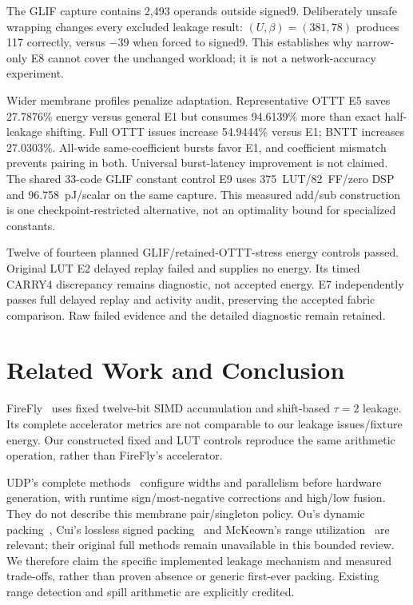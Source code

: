 \documentclass[conference]{IEEEtran}
\begin{document}
The GLIF capture contains 2,493 operands outside signed9. Deliberately unsafe wrapping changes every excluded leakage result: $(U,\beta)=(381,78)$ produces 117 correctly, versus $-39$ when forced to signed9. This establishes why narrow-only E8 cannot cover the unchanged workload; it is not a network-accuracy experiment.

Wider membrane profiles penalize adaptation. Representative OTTT E5 saves 27.7876\% energy versus general E1 but consumes 94.6139\% more than exact half-leakage shifting. Full OTTT issues increase 54.9444\% versus E1; BNTT increases 27.0303\%. All-wide same-coefficient bursts favor E1, and coefficient mismatch prevents pairing in both. Universal burst-latency improvement is not claimed. The shared 33-code GLIF constant control E9 uses 375~LUT/82~FF/zero DSP and 96.758~pJ/scalar on the same capture. This measured add/sub construction is one checkpoint-restricted alternative, not an optimality bound for specialized constants.

Twelve of fourteen planned GLIF/retained-OTTT-stress energy controls passed. Original LUT E2 delayed replay failed and supplies no energy. Its timed CARRY4 discrepancy remains diagnostic, not accepted energy. E7 independently passes full delayed replay and activity audit, preserving the accepted fabric comparison. Raw failed evidence and the detailed diagnostic remain retained.

\section{Related Work and Conclusion}
FireFly~\cite{firefly} uses fixed twelve-bit SIMD accumulation and shift-based $\tau=2$ leakage. Its complete accelerator metrics are not comparable to our leakage issues/fixture energy. Our constructed fixed and LUT controls reproduce the same arithmetic operation, rather than FireFly's accelerator.

UDP's complete methods~\cite{udp} configure widths and parallelism before hardware generation, with runtime sign/most-negative corrections and high/low fusion. They do not describe this membrane pair/singleton policy. Ou's dynamic packing~\cite{ou}, Cui's lossless signed packing~\cite{cui} and McKeown's range utilization~\cite{mckeown} are relevant; their original full methods remain unavailable in this bounded review. We therefore claim the specific implemented leakage mechanism and measured trade-offs, rather than proven absence or generic first-ever packing. Existing range detection and spill arithmetic are explicitly credited.
\end{document}
